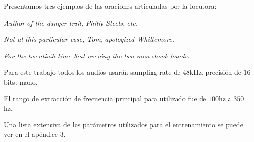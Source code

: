 Presentamos tres ejemplos de las oraciones articuladas por la locutora:

\indent\indent \textit{Author of the danger trail, Philip Steels, etc.}

\indent\indent \textit{Not at this particular case, Tom, apologized Whittemore.}

\indent\indent \textit{For the twentieth time that evening the two men shook hands.}

Para este trabajo todos los audios usarán sampling rate de $48$kHz, precisión de $16$bits, mono.

El rango de extracción de frecuencia principal para  utilizado fue de $100$hz a $350$hz.

Una lista extensiva de los parámetros utilizados para el entrenamiento se puede ver en el apéndice $3$.

